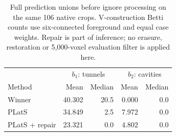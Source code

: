 \begin{table}[t]
\centering
\small
\setlength{\tabcolsep}{4pt}
\begin{tabular}{lrrrr}
\toprule
 & \multicolumn{2}{c}{$b_1$: tunnels} & \multicolumn{2}{c}{$b_2$: cavities} \\
Method & Mean & Median & Mean & Median \\
\midrule
Winner & 40.302 & 20.5 & 0.000 & 0.0 \\
PLatS & 34.849 & 2.5 & 7.972 & 0.0 \\
PLatS + repair & 23.321 & 0.0 & 4.802 & 0.0 \\
\bottomrule
\end{tabular}
\caption{Full prediction unions before ignore processing on the same 106 native crops. V-construction Betti counts use six-connected foreground and equal case weights. Repair is part of inference; no erasure, restoration or 5,000-voxel evaluation filter is applied here.}
\label{tab:rawpredbetti}
\end{table}
